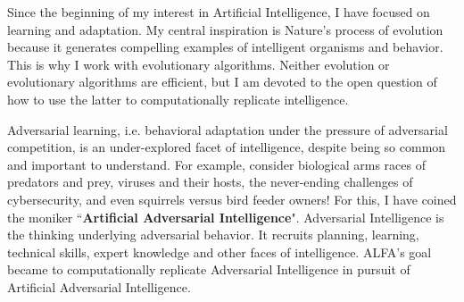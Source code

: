 \documentclass[12pt,bibliography=numbered]{article}
\begin{document}
%
%

\label{Evolutionary inspiration and algorithms}
\vspace{-0.5in}
\noindent 
Since the beginning of my interest in Artificial Intelligence, I have focused on learning and adaptation.
My central inspiration is Nature's process of evolution because it generates compelling examples of intelligent organisms and behavior.  
This is why I work with evolutionary algorithms.
Neither evolution or evolutionary algorithms are efficient, but I am devoted to the open question of how to use the latter to computationally replicate intelligence.

   
Adversarial learning, i.e. behavioral adaptation under the pressure of adversarial competition,  is an under-explored facet of intelligence, despite being so common and important to understand.  For example, consider biological arms races of predators and prey,  viruses and their hosts, the never-ending challenges of cybersecurity, and even squirrels versus bird feeder owners!  For this, I have coined the moniker ``\textbf{Artificial Adversarial Intelligence}".  Adversarial Intelligence is the thinking underlying adversarial behavior. It recruits planning, learning, technical skills, expert knowledge and other faces of intelligence.   ALFA's goal became to computationally replicate Adversarial Intelligence  in pursuit of  Artificial Adversarial Intelligence.  
\end{document}
